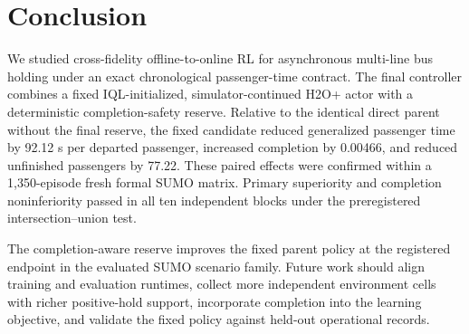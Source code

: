 \section{Conclusion}
\label{sec:conclusion}

We studied cross-fidelity offline-to-online RL for asynchronous multi-line bus
holding under an exact chronological passenger-time contract. The final
controller combines a fixed IQL-initialized, simulator-continued H2O+ actor with
a deterministic completion-safety reserve. Relative to the identical direct
parent without the final reserve, the fixed candidate reduced generalized
passenger time by 92.12 s per departed passenger, increased completion by
0.00466, and reduced unfinished passengers by 77.22. These paired effects were
confirmed within a 1,350-episode fresh formal SUMO matrix. Primary superiority and completion noninferiority passed in all
ten independent blocks under the preregistered intersection--union test.

The completion-aware reserve
improves the fixed parent policy at the registered endpoint in the evaluated
SUMO scenario family. Future work should align
training and evaluation runtimes, collect more independent environment cells
with richer positive-hold support, incorporate completion into the learning
objective, and validate the fixed policy against held-out operational records.
